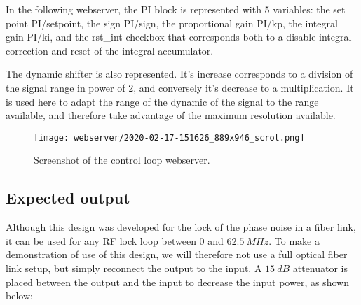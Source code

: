 \documentclass[12pt,oneside]{article}
\begin{document}
In the following webserver, the PI block is represented with 5 variables: the set point PI/setpoint, the sign PI/sign, the proportional gain PI/kp, the integral gain PI/ki, and the rst\_int checkbox that corresponds both to a disable integral correction and reset of the integral accumulator. 
\newline

The dynamic shifter is also represented. It's increase corresponds to a division of the signal range in power of 2, and conversely it's decrease to a multiplication. It is used here to adapt the range of the dynamic of the signal to the range available, and therefore take advantage of the maximum resolution available.

\begin{figure}[h!tb]
	\begin{center}
		\vspace{0.5cm}
		\texttt{[image: webserver/2020-02-17-151626\_889x946\_scrot.png]}
		\caption{Screenshot of the control loop webserver.}
		\label{fig:pll_webserver}
	\end{center}
\end{figure}

\newpage

\subsection{Expected output}

Although this design was developed for the lock of the phase noise in a fiber link, it can be used for any RF lock loop between $0$ and $62.5~MHz$. To make a demonstration of use of this design, we will therefore not use a full optical fiber link setup, but simply reconnect the output to the input. A $15~dB$ attenuator is placed between the output and the input to decrease the input power, as shown below: 
\end{document}
